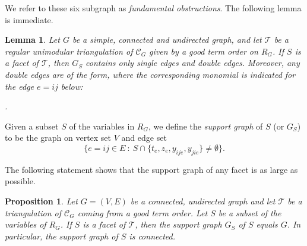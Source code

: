 \documentclass[11pt]{article}
\newtheorem{lemm}[theo]{Lemma}
\newtheorem{prop}[theo]{Proposition}
\theoremstyle{definition}
\numberwithin{equation}{section}
\begin{document}
We refer to these six subgraph as \emph{fundamental obstructions}. 
The following lemma is immediate.
\begin{lemm}
    \label{lem: only double}
    Let $G$ be a simple, connected and undirected graph, and let $\mathcal{T}$ be a regular unimodular triangulation of $\mathcal{C}_G$ given by a good term order on $R_G$.  
    If $S$ is a facet of $\mathcal{T}$, then $G_S$ contains only single edges and double edges. 
    Moreover, any double edges are of the form, where the corresponding monomial is indicated for the edge $e=ij$ below:
    \begin{center}
    .
    \end{center}
\end{lemm}

Given a subset $S$ of the variables in $R_G$, we define the \emph{support graph} of $S$ (or $G_S$) to be the graph on vertex set $V$ and edge set 
\[
\{e=ij\in E~:~S\cap\{t_e,z_e,y_{ije},y_{jie}\}\neq \emptyset\}.
\]

The following statement shows that the support graph of any facet is as large as possible.

\begin{prop}
\label{prop: connected}
Let $G=(V,E)$ be a connected, undirected graph and let $\mathcal{T}$ be a triangulation of $\mathcal{C}_G$ coming from a good term order. Let $S$ be a subset of the variables of $R_G$. If $S$ is a facet of $\mathcal{T}$, then the support graph $G_S$ of $S$ equals $G$. In particular, the support graph of $S$ is connected.
\end{prop}
\end{document}
